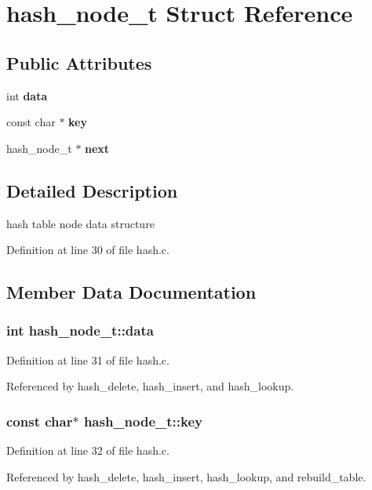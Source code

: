 \section{hash\_\-node\_\-t  Struct Reference}
\label{structhash__node__t}
\subsection*{Public Attributes}
\begin{CompactItemize}
\item 
int {\bf data}
\item 
const char $\ast$ {\bf key}
\item 
hash\_\-node\_\-t $\ast$ {\bf next}
\end{CompactItemize}


\subsection{Detailed Description}
hash table node data structure 



Definition at line 30 of file hash.c.

\subsection{Member Data Documentation}
\subsubsection{\setlength{\rightskip}{0pt plus 5cm}int hash\_\-node\_\-t::data}\label{structhash__node__t_m0}




Definition at line 31 of file hash.c.

Referenced by hash\_\-delete, hash\_\-insert, and hash\_\-lookup.
\subsubsection{\setlength{\rightskip}{0pt plus 5cm}const char$\ast$ hash\_\-node\_\-t::key}\label{structhash__node__t_m1}




Definition at line 32 of file hash.c.

Referenced by hash\_\-delete, hash\_\-insert, hash\_\-lookup, and rebuild\_\-table.
